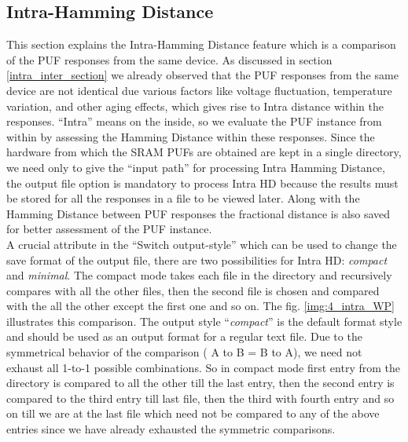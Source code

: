 \subsection{Intra-Hamming Distance}
\label{intra_hd_section}
This section explains the Intra-Hamming Distance feature which is a comparison of the PUF responses from the same device. As discussed in section \ref{intra_inter_section} we already observed that the PUF responses from the same device are not identical due various factors like voltage fluctuation,  temperature variation, and other aging effects, which gives rise to Intra distance within the responses. ``Intra'' means on the inside, so we evaluate the PUF instance from within by assessing the Hamming Distance within
these responses. Since the hardware from which the SRAM PUFs are obtained are kept in a single directory, we need only to give the ``input path'' for processing Intra Hamming Distance, the output file option is mandatory to process Intra HD because the results must be stored for all the responses in a file to be viewed later. Along with the Hamming Distance between PUF responses the fractional distance is also saved for better assessment of the PUF instance.\\

A crucial attribute in the ``Switch output-style'' which can be used to change the save format of the output file, there are two possibilities for Intra HD: \emph{compact} and \emph{minimal}. The compact mode takes each file in the directory and recursively compares with all the other files, then the second file is chosen and compared with the all the other except the first one and so on. The fig. \ref{img:4_intra_WP} illustrates this comparison.  The output style ``\emph{compact}'' is the default format style and should be used
as an output format for a regular text file. Due to the symmetrical behavior of the comparison ( A to B = B to A), we need not exhaust all 1-to-1 possible combinations. So in compact mode first entry from the directory is compared to all the other till the last entry, then the second entry is compared to the third entry till last file, then the third with fourth entry and so on till we are at the last file which need not be compared to any of the above entries since we have already exhausted the
symmetric comparisons.\\


